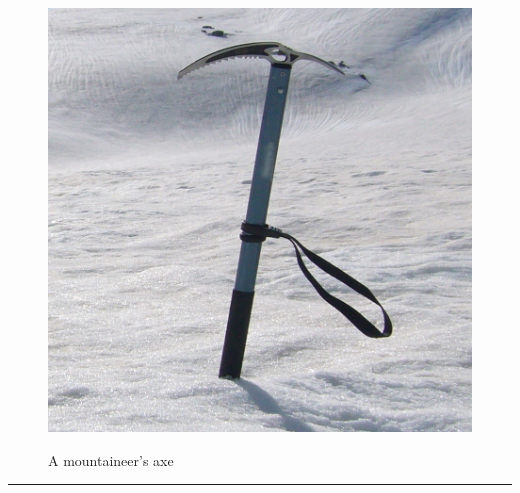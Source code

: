 \documentclass{article}
\begin{document}
    \begin{figure}[H]
        \centering
        \begin{minipage}{0.25\textwidth}
            \centering
            \includegraphics[width=\textwidth]{../SurvivalItemImages/mountainaxe}
        \end{minipage}\hfill
        \begin{minipage}{0.7\textwidth}
            \centering
            \Large A mountaineer's axe
        \end{minipage}
    \end{figure}
    \vspace{-0.8em}
    \noindent\rule{\textwidth}{0.4pt}
            
\end{document}
